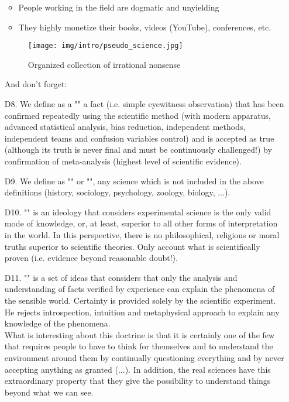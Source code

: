 \begin{itemize}
\begin{itemize}
		\item People working in the field are dogmatic and unyielding
		
		\item They highly monetize their books, videos (YouTube), conferences, etc.
	\end{itemize}
	\begin{figure}[H]
		\centering
		\texttt{[image: img/intro/pseudo\_science.jpg]}
		\caption{Organized collection of irrational nonsense}
	\end{figure}
	And don't forget:
	\begin{center}
	\end{center}
	
	\item[D8.] We define as a "\label{scientific fact}" a fact (i.e. simple eyewitness observation) that has been confirmed repeatedly using the scientific method (with modern apparatus, advanced statistical analysis, bias reduction, independent methods, independent teams and confusion variables control) and is accepted as true (although its truth is never final and must be continuously challenged!) by confirmation of meta-analysis (highest level of scientific evidence).
	
	\item[D9.] We define as "" or "", any science which is not included in the above definitions (history, sociology, psychology, zoology, biology, ...).

	\item[D10.] "" is an ideology that considers experimental science is the only valid mode of knowledge, or, at least, superior to all other forms of interpretation in the world. In this perspective, there is no philosophical, religious or moral truths superior to scientific theories. Only account what is scientifically proven (i.e. evidence beyond reasonable doubt!). 

	\item[D11.] "" is a set of ideas that considers that only the analysis and understanding of facts verified by experience can explain the phenomena of the sensible world. Certainty is provided solely by the scientific experiment. He rejects introspection, intuition and metaphysical approach to explain any knowledge of the phenomena. \\
	
	What is interesting about this doctrine is that it is certainly one of the few that requires people to have to think for themselves and to understand the environment around them by continually questioning everything and by never accepting anything as granted (...). In addition, the real sciences have this extraordinary property that they give the possibility to understand things beyond what we can see. 
\end{itemize}

